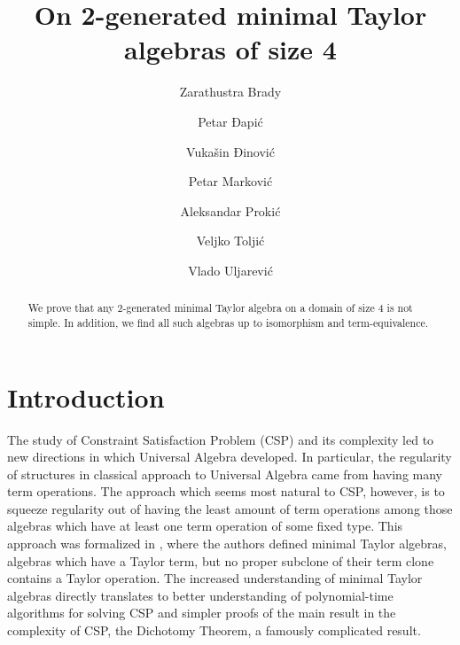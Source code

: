 \documentclass[11pt]{amsart}
\theoremstyle{definition}
\theoremstyle{remark}
\theoremstyle{plain}
\begin{document}
\title{On 2-generated minimal Taylor algebras of size 4}
\author[affil1]{Zarathustra Brady}
\author[affil2]{Petar Đapi\'c}
\author[affil2]{Vuka\v sin Đinovi\' c}
\author[affil2]{Petar Markovi\'c}
\author[affil3]{Aleksandar Proki\'{c}}
\author[affil2]{Veljko Tolji\' c}
\author[affil2]{Vlado Uljarevi\'c}
\address[affil1]{No academic affiliation}
\address[affil2]{Department of Mathematics and Informatics\\ 
University of Novi Sad\\ Serbia}
\address[affil3]{Faculty of Technical Sciences\\ 
University of Novi Sad\\ Serbia}
\newcommand{\AuthorNames}{Z. Brady et al.}
\newcommand{\FilMSC}{Primary 08B05; Secondary 08A05, 08A45}
\newcommand{\FilKeywords}{minimal Taylor algebras}
\newcommand{\FilCommunicated}{Miroslav \'Ciri\'c}
\newcommand{\FilSupport}{P. Đapi\'c, P. Markovi\'c and V. Uljarevi\'c were supported by the Ministry of Education, Science and Technological Development of the Republic of Serbia (Grants No. 451-03-137/2025-03/200125 and 451-03-136/2025-03/200125). Aleksandar Proki\'{c} was supported by the Ministry of Education, Science and Technological Development of the Republic of Serbia (Grant No. 451-03-137/2025-03/200156.)}





\begin{abstract}
We prove that any 2-generated minimal Taylor algebra on a domain of size 4 is not simple. In addition, we find all such algebras up to isomorphism and term-equivalence.
\end{abstract}

\maketitle

\section{Introduction}
The study of Constraint Satisfaction Problem (CSP) and its complexity led to new directions in which Universal Algebra developed. In particular, the regularity of structures in classical approach to Universal Algebra came from having many term operations. The approach which seems most natural to CSP, however, is to squeeze regularity out of having the least amount of term operations among those algebras which have at least one term operation of some fixed type. This approach was formalized in \cite{dreamteam}, where the authors defined minimal Taylor algebras, algebras which have a Taylor term, but no proper subclone of their term clone contains a Taylor operation. The increased understanding of minimal Taylor algebras directly translates to better understanding of polynomial-time algorithms for solving CSP and simpler proofs of the main result in the complexity of CSP, the Dichotomy Theorem, a famously complicated result.
\end{document}
